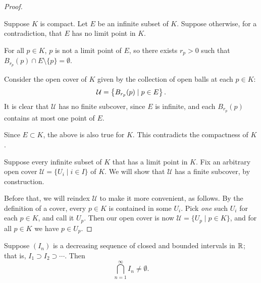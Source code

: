 \begin{proof} \

\fbox{$\implies$} Suppose $K$ is compact. Let $E$ be an infinite subset of $K$. Suppose otherwise, for a contradiction, that $E$ has no limit point in $K$.

For all $p\in K$, $p$ is not a limit point of $E$, so there exists $r_p>0$ such that $B_{r_p}(p)\cap E\setminus\{p\}=\emptyset$.

\begin{figure}[H]
\centering
{}
\end{figure}

Consider the open cover of $K$ given by the collection of open balls at each $p\in K$:
\[\mathcal{U}=\left\{B_{r_p}(p)\mid p\in E\right\}.\]
It is clear that $\mathcal{U}$ has no finite subcover, since $E$ is infinite, and each $B_{r_p}(p)$ contains at most one point of $E$.

Since $E\subset K$, the above is also true for $K$. This contradicts the compactness of $K$.

\fbox{$\impliedby$} Suppose every infinite subset of $K$ that has a limit point in $K$. Fix an arbitrary open cover $\mathcal{U}=\{U_i\mid i\in I\}$ of $K$. We will show that $\mathcal{U}$ has a finite subcover, by construction.

Before that, we will reindex $\mathcal{U}$ to make it more convenient, as follows. By the definition of a cover, every $p\in K$ is contained in some $U_i$. Pick \emph{one} such $U_i$ for each $p\in K$, and call it $U_p$. Then our open cover is now $\mathcal{U}=\{U_p\mid p\in K\}$, and for all $p\in K$ we have $p\in U_p$.

\end{proof}

\begin{proposition}\label{prop:nested-interval}
Suppose $(I_n)$ is a decreasing sequence of closed and bounded intervals in $\mathbb R$; that is, $I_1\supset I_2\supset\cdots$. Then
\[\bigcap_{n=1}^{\infty}I_n\neq\emptyset.\]
\end{proposition}

